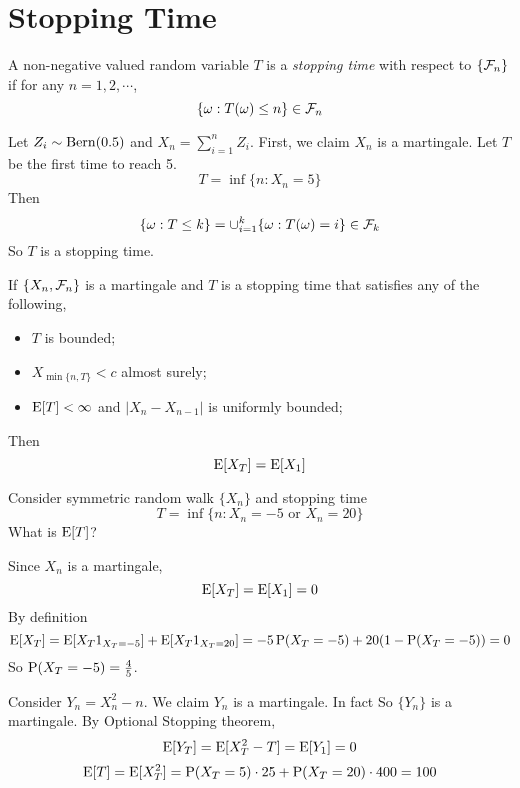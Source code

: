 \section{Stopping Time}
A non-negative valued random variable $T$ is a \textit{stopping time} with respect to $\{\Fc_n\}$ if for any $n=1,2,\cdots$,
$$\{\omega: T(\omega) \leq n\} \in \Fc_n$$

\begin{exmp}{}
	Let $Z_i \sim \Bern(0.5)$ and $X_n= \sum_{i=1}^n Z_i$. First, we claim $X_n$ is a martingale.
	Let $T$ be the first time to reach 5.
	$$T=\inf\{n: X_n = 5\}$$
	Then
	$$\{\omega: T\leq k \} = \cup_{i=1}^k \{\omega: T(\omega) = i\} \in \Fc_k$$
	So $T$ is a stopping time.
\end{exmp}

\begin{theorem}
	If $\{X_n, \Fc_n\}$ is a martingale and $T$ is a stopping time that satisfies any of the following,
	\begin{itemize}
		\item $T$ is bounded;
		\item $X_{\min \{n, T\}} < c$ almost surely;
		\item $\E[T]<\infty$ and $|X_n-X_{n-1}|$ is uniformly bounded;
	\end{itemize}
	Then $$\E[X_T] = \E[X_1]$$
\end{theorem}

\begin{excr}{}
	Consider symmetric random walk $\{X_n\}$ and stopping time
	$$T= \inf \{n: X_n = -5 \textrm{ or } X_n=20\}$$
	What is $\E[T]$?
\end{excr}
\begin{soln}
	Since $X_n$ is a martingale,
	$$\E[X_T]=\E[X_1] = 0$$
	By definition 
	$$\E[X_T] = \E[X_T 1_{X_T=-5}]+\E[X_T 1_{X_T=20}]=-5\P(X_T=-5)+20(1-\P(X_T=-5)) = 0$$
	So $\P(X_T=-5)= \frac{4}{5}$.
	
	Consider $Y_n = X_n^2-n$. We claim $Y_n$ is a martingale. In fact
	So $\{Y_n\}$ is a martingale. By Optional Stopping theorem,
	$$\E[Y_T]=\E[X_T^2-T]=\E[Y_1]=0$$
	$$\E[T] =\E[X^2_T] = \P(X_T=5)\cdot 25 + \P(X_T=20) \cdot 400 = 100$$ 
\end{soln}